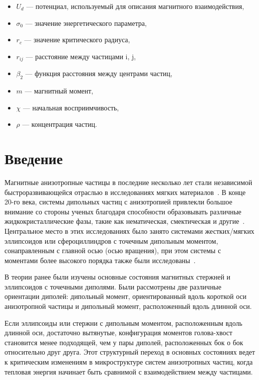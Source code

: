 \documentclass[a4paper,14pt]{extarticle}
\begin{document}
    \begin{itemize}[label={}]
        \item $U_d$ --- потенциал, используемый для описания магнитного взаимодействия,
        \item $\sigma_0$ --- значение энергетического параметра,
        \item $r_c$ --- значение критического радиуса,
        \item $r_{ij}$ --- расстояние между частицами i, j,
        \item $\beta_2$ --- функция расстояния между центрами частиц,
        \item $m$ --- магнитный момент,
        \item $\chi$ --- начальная восприимчивость,
        \item $\rho$ --- концентрация частиц.
    \end{itemize}

    \newpage

    \section*{Введение}

    Магнитные анизотропные частицы в последние несколько лет стали независимой быстроразвивающейся отраслью в исследованиях мягких материалов~\cite{bib:three, bib:four, bib:five, bib:six}. В конце 20-го века, системы дипольных частиц с анизотропией привлекли большое внимание со стороны ученых благодаря способности образовывать различные жидкокристаллические фазы, такие как нематическая, смектическая и другие~\cite{bib:seven, bib:eight, bib:nine, bib:ten}. Центральное место в этих исследованиях было занято системами жестких/мягких эллипсоидов или сфероциллиндров с точечным дипольным моментом, сонаправленным с главной осью (осью вращения), при этом системы с моментами более высокого порядка также были исследованы~\cite{bib:one}.

    В теории ранее были изучены основные состояния магнитных стержней и эллипсоидов с точечными диполями. Были рассмотрены две различные ориентации диполей: дипольный момент, ориентированный вдоль короткой оси анизотропной частицы и дипольный момент, расположенный вдоль длинной оси.

    Если эллипсоиды или стержни с дипольным моментом, расположенным вдоль длинной оси, достаточно вытянутые, конфигурация моментов голова-хвост становится менее подходящей, чем у пары диполей, расположенных бок о бок относительно друг друга. Этот структурный переход в основных состояниях ведет к критическим изменениям в микроструктуре систем анизотропных частиц, когда тепловая энергия начинает быть сравнимой с взаимодействием между частицами.
\end{document}

